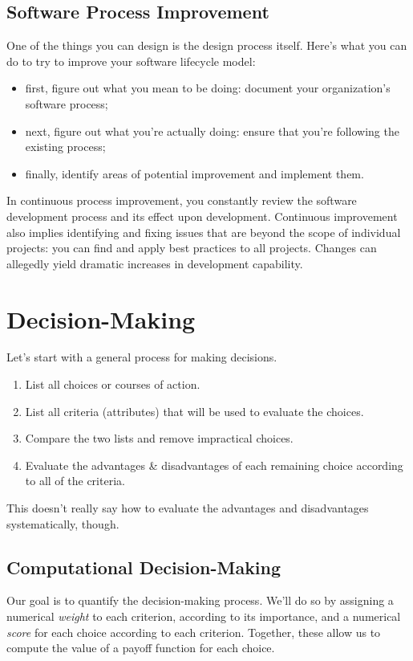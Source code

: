 \subsection*{Software Process Improvement}
One of the things you can
design is the design process itself. Here's what you can do to try to 
improve your software lifecycle model:\\[-2.5em]

\begin{itemize}
\item first, figure out what you mean to be doing: document your organization's software process;
\item next, figure out what you're actually doing: ensure that you're following the existing process; 
\item finally, identify areas of potential improvement and implement them.
\end{itemize}

In continuous process improvement, you constantly review the software
development process and its effect upon development. Continuous improvement 
also implies identifying and fixing issues that are
beyond the scope of individual projects: you can find and apply best
practices to all projects. Changes can allegedly yield dramatic
increases in development capability.


\section*{Decision-Making}
Let's start with a general process for 
making decisions. 

\begin{enumerate}
\item List all choices or courses of action.
\item List all criteria (attributes) that will be used to evaluate the choices.
\item Compare the two lists and remove impractical choices.
\item Evaluate the advantages \& disadvantages of each remaining choice
according to all of the criteria.
\end{enumerate}

This doesn't really say how to evaluate the advantages and disadvantages
systematically, though. 

\subsection*{Computational Decision-Making}
Our goal is to quantify the decision-making process. We'll do so by assigning 
a numerical \emph{weight} to each criterion, according to its importance, and a
numerical \emph{score} for each choice according to each criterion.
Together, these allow us to compute the value of a payoff function for
each choice.

